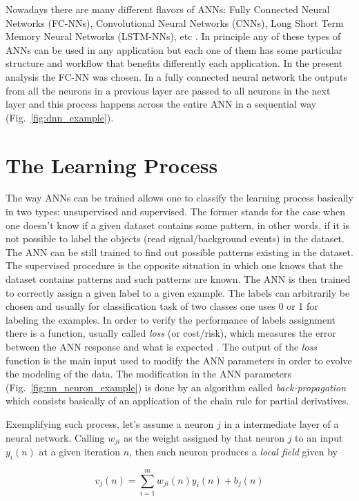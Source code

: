 Nowadays there are many different flavors of ANNs: Fully Connected Neural Networks (FC-NNs), Convolutional Neural Networks (CNNs), Long Short Term Memory Neural Networks (LSTM-NNs), etc \cite{bib:SimonHaykin}. In principle any of these types of ANNs can be used in any application but each one of them has some particular structure and workflow that benefits differently each application. In the present analysis the FC-NN was chosen. In a fully connected neural network the outputs from all the neurons in a previous layer are passed to all neurons in the next layer and this process happens across the entire ANN in a sequential way (Fig.~\ref{fig:dnn_example}).

\section{The Learning Process}
The way ANNs can be trained allows one to classify the learning process basically in two types: unsupervised and supervised. The former stands for the case when one doesn't know if a given dataset contains some pattern, in other words, if it is not possible to label the objects (read signal/background events) in the dataset. The ANN can be still trained to find out possible patterns existing in the dataset. The supervised procedure is the opposite situation in which one knows that the dataset contains patterns and such patterns are known. The ANN is then trained to correctly assign a given label to a given example. The labels can arbitrarily be chosen and usually for classification task of two classes one uses 0 or 1 for labeling the examples. In order to verify the performance of labels assignment there is a function, usually called \textit{loss} (or cost/risk), which measures the error between the ANN response and what is expected \cite{bib:SimonHaykin}. The output of the \textit{loss} function is the main input used to modify the ANN parameters in order to evolve the modeling of the data. The modification in the ANN parameters (Fig.~\ref{fig:nn_neuron_example}) is done by an algorithm called \textit{back-propagation} which consists basically of an application of the chain rule for partial derivatives.

Exemplifying such process, let's assume a neuron $j$ in a intermediate layer of a neural network. Calling $w_{ji}$ as the weight assigned by that neuron $j$ to an input $y_{i}(n)$ at a given iteration $n$, then such neuron produces a \textit{local field} given by

\begin{equation}
v_{j}(n) = \sum_{i=1}^{m} w_{ji}(n)y_{i}(n) + b_{j}(n)
\label{neuron_local_field}
\end{equation}


